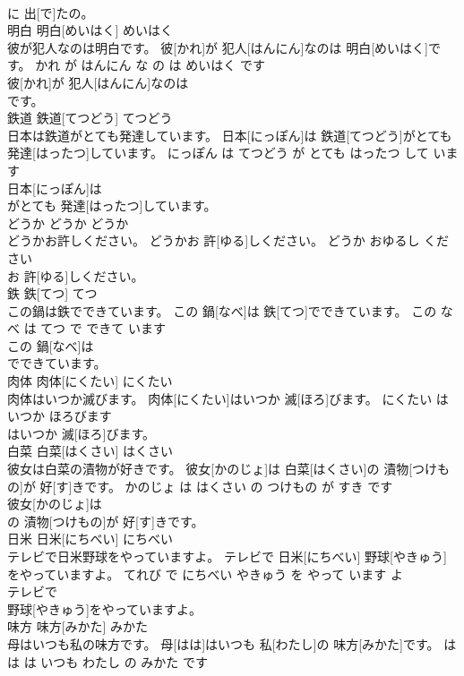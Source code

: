\documentclass[8pt]{extreport}
\begin{document}
\begin{CJK}{UTF8}{min}
\\	に 出[で]たの。			
\\	明白	明白[めいはく]	めいはく	
\\	彼が犯人なのは明白です。	彼[かれ]が 犯人[はんにん]なのは 明白[めいはく]です。	かれ が はんにん な の は めいはく です	
\\	彼[かれ]が 犯人[はんにん]なのは
\\	です。			
\\	鉄道	鉄道[てつどう]	てつどう	
\\	日本は鉄道がとても発達しています。	日本[にっぽん]は 鉄道[てつどう]がとても 発達[はったつ]しています。	にっぽん は てつどう が とても はったつ して います	
\\	日本[にっぽん]は
\\	がとても 発達[はったつ]しています。			
\\	どうか	どうか	どうか	
\\	どうかお許しください。	どうかお 許[ゆる]しください。	どうか おゆるし ください	
\\	お 許[ゆる]しください。			
\\	鉄	鉄[てつ]	てつ	
\\	この鍋は鉄でできています。	この 鍋[なべ]は 鉄[てつ]でできています。	この なべ は てつ で できて います	
\\	この 鍋[なべ]は
\\	でできています。			
\\	肉体	肉体[にくたい]	にくたい	
\\	肉体はいつか滅びます。	肉体[にくたい]はいつか 滅[ほろ]びます。	にくたい は いつか ほろびます	
\\	はいつか 滅[ほろ]びます。			
\\	白菜	白菜[はくさい]	はくさい	
\\	彼女は白菜の漬物が好きです。	彼女[かのじょ]は 白菜[はくさい]の 漬物[つけもの]が 好[す]きです。	かのじょ は はくさい の つけもの が すき です	
\\	彼女[かのじょ]は
\\	の 漬物[つけもの]が 好[す]きです。			
\\	日米	日米[にちべい]	にちべい	
\\	テレビで日米野球をやっていますよ。	テレビで 日米[にちべい] 野球[やきゅう]をやっていますよ。	てれび で にちべい やきゅう を やって います よ	
\\	テレビで
\\	野球[やきゅう]をやっていますよ。			
\\	味方	味方[みかた]	みかた	
\\	母はいつも私の味方です。	母[はは]はいつも 私[わたし]の 味方[みかた]です。	はは は いつも わたし の みかた です	

\end{CJK}
\end{document}
